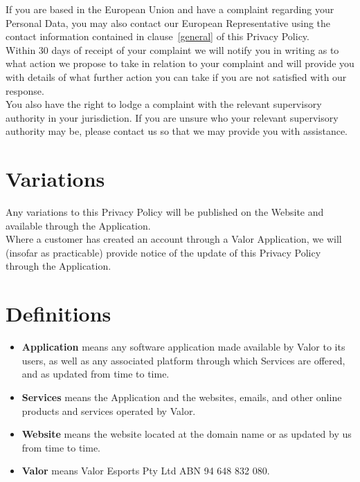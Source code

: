 \documentclass[10pt]{article}
\begin{document}
If you are based in the European Union and have a complaint regarding your Personal Data, you may also contact our European Representative using the contact information contained in clause~\ref{general} of this Privacy Policy. \\

Within 30 days of receipt of your complaint we will notify you in writing as to what action we propose to take in relation to your complaint and will provide you with details of what further action you can take if you are not satisfied with our response. \\

You also have the right to lodge a complaint with the relevant supervisory authority in your jurisdiction. If you are unsure who your relevant supervisory authority may be, please contact us so that we may provide you with assistance.


\section{Variations}
Any variations to this Privacy Policy will be published on the Website and available through the Application. \\

Where a customer has created an account through a Valor Application, we will (insofar as practicable) provide notice of the update of this Privacy Policy through the Application.


\section{Definitions}
\begin{itemize}
	\item[]
	\textbf{Application} means any software application made available by Valor to its users, as well as any associated platform through which Services are offered, and as updated from time to time.

	\item[]
	\textbf{Services} means the Application and the websites, emails, and other online products and services operated by Valor.

	\item[]
	\textbf{Website} means the website located at the domain name or as updated by us from time to time.

	\item[]	
	\textbf{Valor} means Valor Esports Pty Ltd ABN 94 648 832 080.
\end{itemize}
\end{document}
